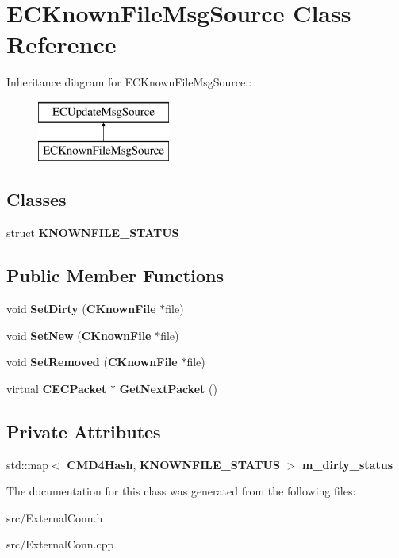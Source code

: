 \section{ECKnownFileMsgSource Class Reference}
\label{classECKnownFileMsgSource}
Inheritance diagram for ECKnownFileMsgSource::\begin{figure}[H]
\begin{center}
\leavevmode
\includegraphics[height=2cm]{classECKnownFileMsgSource}
\end{center}
\end{figure}
\subsection*{Classes}
\begin{DoxyCompactItemize}
\item 
struct {\bf KNOWNFILE\_\-STATUS}
\end{DoxyCompactItemize}
\subsection*{Public Member Functions}
\begin{DoxyCompactItemize}
\item 
void {\bfseries SetDirty} ({\bf CKnownFile} $\ast$file)\label{classECKnownFileMsgSource_adbe2ac4ff0f93566a661637237a97618}

\item 
void {\bfseries SetNew} ({\bf CKnownFile} $\ast$file)\label{classECKnownFileMsgSource_a2a10604484555e89fbbfaf7dc3c0c3c3}

\item 
void {\bfseries SetRemoved} ({\bf CKnownFile} $\ast$file)\label{classECKnownFileMsgSource_ab787e9c7e60fd5b9217f89879e79be79}

\item 
virtual {\bf CECPacket} $\ast$ {\bfseries GetNextPacket} ()\label{classECKnownFileMsgSource_aed7a0a053aa568b38ab533e0bb5f90e6}

\end{DoxyCompactItemize}
\subsection*{Private Attributes}
\begin{DoxyCompactItemize}
\item 
std::map$<$ {\bf CMD4Hash}, {\bf KNOWNFILE\_\-STATUS} $>$ {\bfseries m\_\-dirty\_\-status}\label{classECKnownFileMsgSource_a8b1cae884b2fc373dad107073b9afcd3}

\end{DoxyCompactItemize}


The documentation for this class was generated from the following files:\begin{DoxyCompactItemize}
\item 
src/ExternalConn.h\item 
src/ExternalConn.cpp\end{DoxyCompactItemize}
